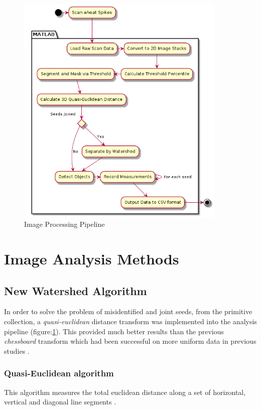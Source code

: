 \documentclass[11pt]{report}
\begin{document}
\begin{center}
\begin{figure}[htb]
\centering
\includegraphics[width=10cm]{./images/matlab.png}
\caption{\label{fig:matlab}Image Processing Pipeline}
\end{figure}
\end{center}

\section{Image Analysis Methods}
\label{sec-3-2}
\subsection{New Watershed Algorithm}
\label{sec-3-2-1}

In order to solve the problem of misidentified and joint seeds, from the primitive collection,
a  \emph{quasi-euclidean} distance transform was implemented into the analysis pipeline (figure:\ref{fig:matlab}). This provided much better results than the previous
\emph{chessboard} transform which had been successful on more uniform data in previous studies \cite{Hughes2017}.

\subsubsection{Quasi-Euclidean algorithm}
\label{sec-3-2-1-1}

This algorithm measures the total euclidean distance along a set of horizontal, vertical and diagonal
line segments \cite{Pfaltz1966}.
\end{document}
